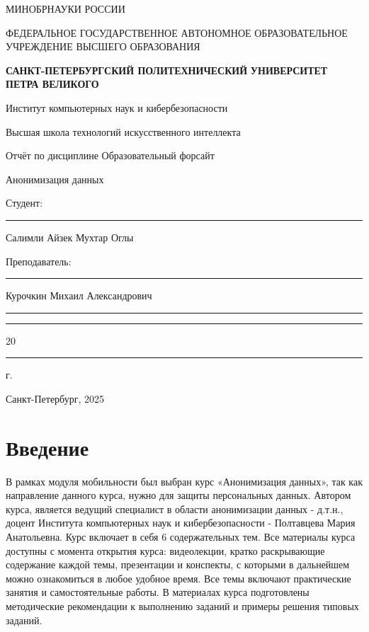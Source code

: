 \documentclass[areasetadvanced]{scrartcl}
\begin{document}
\sloppy
	\thispagestyle{empty}
	\begin{center}
		\large{МИНОБРНАУКИ РОССИИ} \par
		\vspace{0.3cm}
		\normalsize
		{ФЕДЕРАЛЬНОЕ ГОСУДАРСТВЕННОЕ АВТОНОМНОЕ ОБРАЗОВАТЕЛЬНОЕ УЧРЕЖДЕНИЕ ВЫСШЕГО ОБРАЗОВАНИЯ} \par
		\vspace{0.3cm}
		\textbf{\guillemotleft САНКТ-ПЕТЕРБУРГСКИЙ ПОЛИТЕХНИЧЕСКИЙ}
		\textbf{УНИВЕРСИТЕТ ПЕТРА ВЕЛИКОГО\guillemotright} \par
		\vspace{0.3cm}
		{Институт компьютерных наук и кибербезопасности}\par
		{Высшая школа технологий искусственного интеллекта}\par
	\end{center}
	\vfill
	\begin{center}
		{\large Отчёт по дисциплине \guillemotleft Образовательный форсайт\guillemotright}\par
		{\huge   Анонимизация данных}\par 
         
	\end{center}
	\vfill
	\begin{flushleft}
		Студент: \hspace{1.8cm} \rule[0pt]{2.5cm}{0.5pt}\hfill Салимли Айзек Мухтар Оглы\par
		\vspace{1.5cm}
		Преподаватель: \hspace{0.55cm} \rule[0pt]{2.5cm}{0.5pt}\hfill  Курочкин Михаил Александрович
	\end{flushleft}
	\vspace{0.5cm}
	\begin{flushright}
		\guillemotleft \rule[0pt]{0.8cm}{0.5pt}\guillemotright \rule[0pt]{2cm}{0.5pt} 20\rule[0pt]{0.5cm}{0.5pt} г.
	\end{flushright}
	\vfill
	\begin{center}
		Санкт-Петербург, 2025
	\end{center}
	\newpage
	\tableofcontents
	\newpage
\section*{Введение}
    В рамках модуля мобильности был выбран курс «Анонимизация данных», так как направление данного курса, нужно для защиты персональных данных.
    Автором курса, является ведущий специалист в области анонимизации данных - д.т.н., доцент Института компьютерных наук и кибербезопасности - Полтавцева Мария Анатольевна.
    Курс включает в себя 6 содержательных тем. Все материалы курса доступны с
    момента открытия курса: видеолекции, кратко раскрывающие содержание каждой темы,
    презентации и конспекты, с которыми в дальнейшем можно ознакомиться в любое удобное
    время. Все темы включают практические занятия и самостоятельные работы. В материалах
    курса подготовлены методические рекомендации к выполнению заданий и примеры решения
    типовых заданий.
\end{document}
